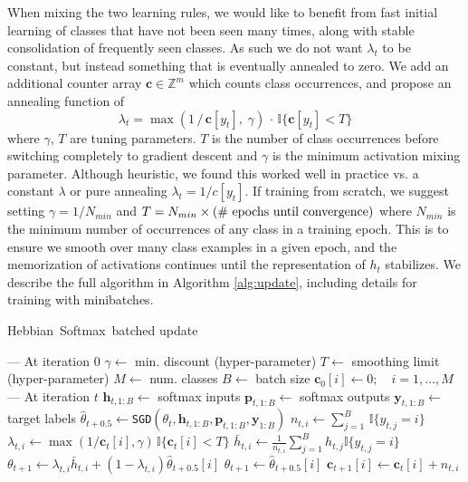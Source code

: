 \documentclass{article} \usepackage{hyperref}
\newcommand{\model}{\hbox{Hebbian Softmax }}
\def\c{\mathbf{c}}
\def\h{\mathbf{h}}
\def\p{\mathbf{p}}
\def\y{\mathbf{y}}
\begin{document}
When mixing the two learning rules, we would like to benefit from fast initial learning of classes that have not been seen many times, along with stable consolidation of frequently seen classes. As such we do not want $\lambda_t$ to be constant, but instead something that is eventually annealed to zero. We add an additional counter array $\c \in \mathbb{Z}^m$ which counts class occurrences, and propose an annealing function of
\begin{equation}
\label{eq:anneal}
\lambda_t = \max(1 \, /\, \c[y_t], \; \gamma) \, \cdot \, \mathbb{I}\{\c[y_t] < T\}
\end{equation}
where $\gamma,\, T$ are tuning parameters. $T$ is the number of class occurrences before switching completely to gradient descent and $\gamma$ is the minimum activation mixing parameter. Although heuristic, we found this worked well in practice vs. a constant $\lambda$ or pure annealing $\lambda_t = 1 / c[y_t]$. If training from scratch, we suggest setting $\gamma = 1 / N_{min}$ and $T = N_{min} \times (\hbox{\# epochs until convergence})$ where $N_{min}$ is the minimum number of occurrences of any class in a training epoch. This is to ensure we smooth over many class examples in a given epoch, and the memorization of activations continues until the representation of $h_t$ stabilizes. We describe the full algorithm in Algorithm \ref{alg:update}, including details for training with minibatches.
\begin{algorithm}[tb]
   \caption{\model batched update}
   \label{alg:update}
\begin{algorithmic}
   \STATE --- At iteration $0$
   \STATE $\gamma \leftarrow $ min. discount (hyper-parameter)
   \STATE $T \leftarrow $ smoothing limit (hyper-parameter)
   \STATE $M \leftarrow $ num. classes
   \STATE $B \leftarrow $ batch size
   \STATE $\c_{0}[i] \leftarrow 0; \quad i = 1, \ldots, M$
   \STATE --- At iteration $t$
    \STATE $\h_{t, 1:B} \leftarrow $ softmax inputs
    \STATE $\p_{t, 1:B} \leftarrow $ softmax outputs
    \STATE $\y_{t, 1:B} \leftarrow $ target labels
    \STATE $\hat\theta_{t + 0.5} \leftarrow $\texttt{SGD}$(\theta_t, \h_{t, 1:B}, \p_{t, 1:B}, \y_{1:B})$
        \STATE $n_{t,i} \leftarrow \sum_{j=1}^B \, \mathbb{I}\{y_{t, j}=i\}$ 
            \STATE $\lambda_{t, i} \leftarrow \max(1 / \c_t[i], \gamma) \, \mathbb{I}\{\c_t[i] < T \} $
            \STATE $\bar{h}_{t, i} \leftarrow \frac{1}{n_{t, i}} \sum_{j=1}^B h_{t, j} \mathbb{I}\{y_{t, j}=i\} $
            \STATE $\theta_{t+1} \leftarrow \lambda_{t, i} \bar{h}_{t, i} + (1 - \lambda_{t, i}) \hat\theta_{t+0.5}[i]$
        \ELSE
            \STATE $\theta_{t+1} \leftarrow \hat\theta_{t + 0.5}[i]$
        \ENDIF
        \STATE $\c_{t+1}[i] \leftarrow \c_t[i] + n_{t, i}$
    \ENDFOR

\end{algorithmic}
\end{algorithm}
\end{document}
